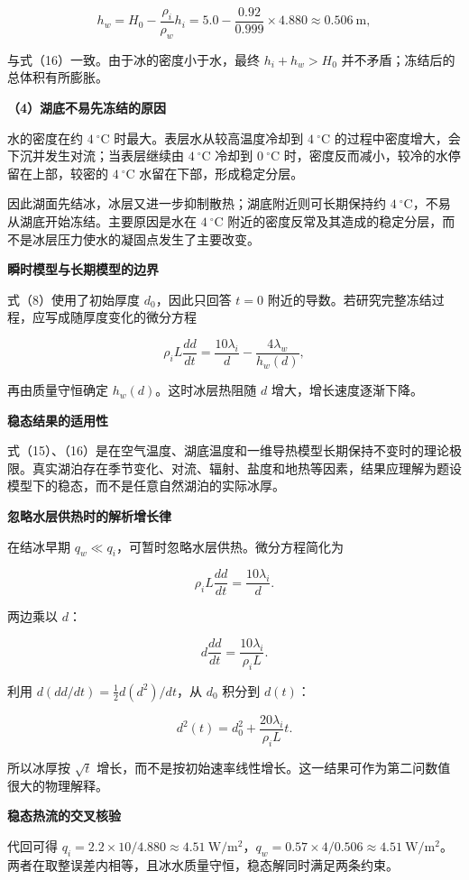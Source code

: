 \documentclass[12pt,a4paper,UTF8]{ctexart}
\begin{document}
\[
h_w=H_0-\frac{\rho_i}{\rho_w}h_i
=5.0-\frac{0.92}{0.999}\times4.880
\approx0.506\ \mathrm m,
\]

与式（16）一致。由于冰的密度小于水，最终 \(h_i+h_w>H_0\)
并不矛盾；冻结后的总体积有所膨胀。

\textbf{（4）湖底不易先冻结的原因}

水的密度在约 \(4\ ^\circ\mathrm C\) 时最大。表层水从较高温度冷却到
\(4\ ^\circ\mathrm C\) 的过程中密度增大，会下沉并发生对流；当表层继续由
\(4\ ^\circ\mathrm C\) 冷却到 \(0\ ^\circ\mathrm C\)
时，密度反而减小，较冷的水停留在上部，较密的 \(4\ ^\circ\mathrm C\)
水留在下部，形成稳定分层。

因此湖面先结冰，冰层又进一步抑制散热；湖底附近则可长期保持约
\(4\ ^\circ\mathrm C\)，不易从湖底开始冻结。主要原因是水在
\(4\ ^\circ\mathrm C\)
附近的密度反常及其造成的稳定分层，而不是冰层压力使水的凝固点发生了主要改变。

\textbf{瞬时模型与长期模型的边界}

式（8）使用了初始厚度 \(d_0\)，因此只回答 \(t=0\)
附近的导数。若研究完整冻结过程，应写成随厚度变化的微分方程

\[
\rho_iL\frac{dd}{dt}
=\frac{10\lambda_i}{d}
-\frac{4\lambda_w}{h_w(d)},
\]

再由质量守恒确定 \(h_w(d)\)。这时冰层热阻随 \(d\)
增大，增长速度逐渐下降。

\textbf{稳态结果的适用性}

式（15）、（16）是在空气温度、湖底温度和一维导热模型长期保持不变时的理论极限。真实湖泊存在季节变化、对流、辐射、盐度和地热等因素，结果应理解为题设模型下的稳态，而不是任意自然湖泊的实际冰厚。

\textbf{忽略水层供热时的解析增长律}

在结冰早期 \(q_w\ll q_i\)，可暂时忽略水层供热。微分方程简化为

\[
\rho_iL\frac{dd}{dt}=\frac{10\lambda_i}{d}.
\]

两边乘以 \(d\)：

\[
d\frac{dd}{dt}=\frac{10\lambda_i}{\rho_iL}.
\]

利用 \(d(dd/dt)=\tfrac12d(d^2)/dt\)，从 \(d_0\) 积分到 \(d(t)\)：

\[
\boxed{
d^2(t)=d_0^2+\frac{20\lambda_i}{\rho_iL}t
}.
\]

所以冰厚按 \(\sqrt t\)
增长，而不是按初始速率线性增长。这一结果可作为第二问数值很大的物理解释。

\textbf{稳态热流的交叉核验}

代回可得
\(q_i=2.2\times10/4.880\approx4.51\ \mathrm{W/m^2}\)，\(q_w=0.57\times4/0.506\approx4.51\ \mathrm{W/m^2}\)。两者在取整误差内相等，且冰水质量守恒，稳态解同时满足两条约束。
\end{document}

